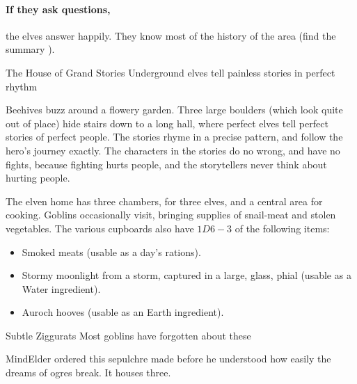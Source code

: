 \begin{multicols}{2}
\paragraph{If they ask questions,}
the elves answer happily.
They know most of the history of the area (find the summary ).

{The House of Grand Stories}%
{Underground elves tell painless stories in perfect rhythm}%

Beehives buzz around a flowery garden.
Three large boulders (which look quite out of place) hide stairs down to a long hall, where perfect elves tell perfect stories of perfect people.
The stories rhyme in a precise pattern, and follow the hero's journey exactly.
The characters in the stories do no wrong, and have no fights, because fighting hurts people, and the storytellers never think about hurting people.

The elven home has three chambers, for three elves, and a central area for cooking.
Goblins occasionally visit, bringing supplies of snail-meat and stolen vegetables.
The various cupboards also have $1D6-3$ of the following items:

\begin{itemize}
  \item
  Smoked meats (usable as a day's \glspl{ration}).
  \item
  Stormy moonlight from a storm, captured in a large, glass, phial (usable as a Water \gls{ingredient}).
  \item
  Auroch hooves (usable as an Earth \gls{ingredient}).
\end{itemize}

\elf

{Subtle Ziggurats}%
{Most goblins have forgotten about these }%

\Gls{MindElder} ordered this sepulchre made before he understood how easily the dreams of \glspl{ogre} break.
It houses three.

\end{multicols}

\stopcontents[sq]
